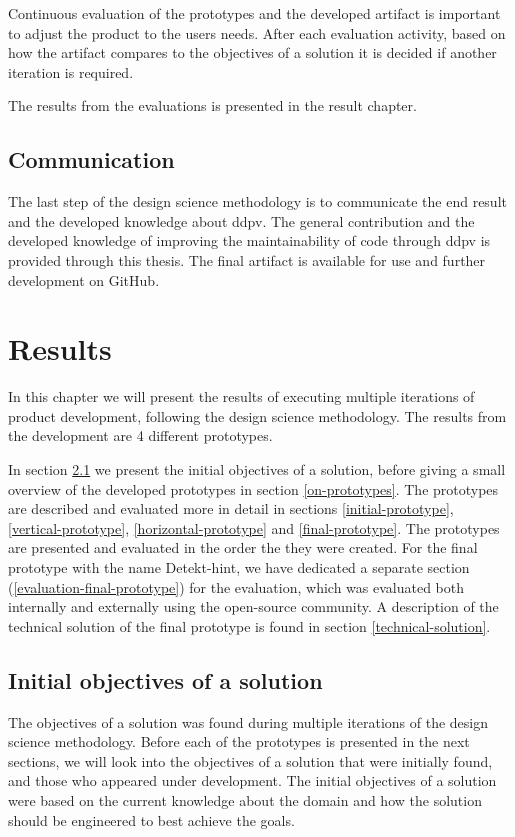 \documentclass[pdftex,10pt,b5paper,twoside]{report}
\begin{document}
Continuous evaluation of the prototypes and the developed artifact is important to adjust the product to the users needs. After each evaluation activity, based on how the artifact compares to the objectives of a solution it is decided if another iteration is required.

The results from the evaluations is presented in the result chapter.

\section{Communication}
The last step of the design science methodology is to communicate the end result and the developed knowledge about \gls{ddpv}. The general contribution and the developed knowledge of improving the maintainability of code through \gls{ddpv} is provided through this thesis. The final artifact is available for use and further development on GitHub\cite{detekt-hint-repository}.
\cleardoublepage


\chapter{Results}
\label{results}

In this chapter we will present the results of executing multiple iterations of product development, following the design science methodology. The results from the development are 4 different prototypes.

In section \ref{initial-os} we present the initial objectives of a solution, before giving a small overview of the developed prototypes in section \ref{on-prototypes}. 
The prototypes are described and evaluated more in detail in sections \ref{initial-prototype}, \ref{vertical-prototype}, \ref{horizontal-prototype} and \ref{final-prototype}. The prototypes are presented and evaluated in the order the they were created. For the final prototype with the name Detekt-hint, we have dedicated a separate section (\ref{evaluation-final-prototype}) for the evaluation, which was evaluated both internally and externally using the open-source community. A description of the technical solution of the final prototype is found in section \ref{technical-solution}.

\section{Initial objectives of a solution}
\label{initial-os}
The objectives of a solution was found during multiple iterations of the design science methodology. Before each of the prototypes is presented in the next sections, we will look into the objectives of a solution that were initially found, and those who appeared under development. The initial objectives of a solution were based on the current knowledge about the domain and how the solution should be engineered to best achieve the goals. 
\end{document}
